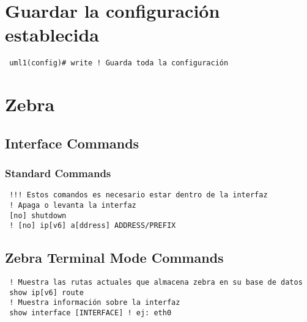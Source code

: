 \documentclass{article}
\begin{document}
\section{Guardar la configuración establecida}
\begin{verbatim}
 uml1(config)# write ! Guarda toda la configuración
\end{verbatim}

\section{Zebra}
\subsection{Interface Commands}
\subsubsection{Standard Commands}
\begin{verbatim}
 !!! Estos comandos es necesario estar dentro de la interfaz
 ! Apaga o levanta la interfaz
 [no] shutdown
 ! [no] ip[v6] a[ddress] ADDRESS/PREFIX
\end{verbatim}

\subsection{Zebra Terminal Mode Commands}
\begin{verbatim}
 ! Muestra las rutas actuales que almacena zebra en su base de datos
 show ip[v6] route
 ! Muestra información sobre la interfaz
 show interface [INTERFACE] ! ej: eth0
\end{verbatim}




\end{document}
